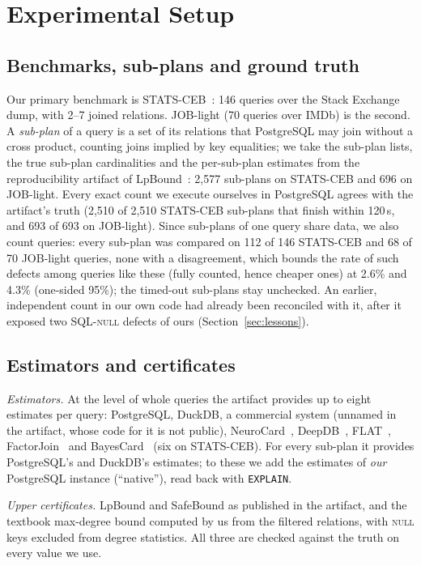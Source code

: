 \documentclass[sigconf, nonacm]{acmart}
\begin{document}
\section{Experimental Setup}
\label{sec:setup}

\subsection{Benchmarks, sub-plans and ground truth}
Our primary benchmark is STATS-CEB~\cite{han2021cardest}: 146 queries over the
Stack Exchange dump, with 2--7 joined relations. JOB-light (70 queries over
IMDb) is the second. A \emph{sub-plan} of a query is a set of its relations that
PostgreSQL may join without a cross product, counting joins implied by key
equalities; we take the sub-plan lists, the true sub-plan cardinalities and the
per-sub-plan estimates from the reproducibility artifact of
LpBound~\cite{zhang2025lpbound}: 2{,}577 sub-plans on STATS-CEB and 696 on
JOB-light. Every exact count we execute ourselves in PostgreSQL agrees with the
artifact's truth (2{,}510 of 2{,}510 STATS-CEB sub-plans that finish within
120\,s, and 693 of 693 on JOB-light). Since sub-plans of one query share data, we
also count queries: every sub-plan was compared on 112 of 146 STATS-CEB and 68
of 70 JOB-light queries, none with a disagreement, which bounds the rate of
such defects among queries like these (fully counted, hence cheaper ones) at 2.6\% and 4.3\%
(one-sided 95\%); the timed-out sub-plans stay unchecked. An earlier, independent count in our own code had already been
reconciled with it, after it exposed two SQL-\textsc{null} defects of ours
(Section~\ref{sec:lessons}).

\subsection{Estimators and certificates}
\emph{Estimators.} At the level of whole queries the artifact provides up to
eight estimates per query: PostgreSQL, DuckDB, a commercial system (unnamed
in the artifact, whose code for it is not public),
NeuroCard~\cite{yang2021neurocard}, DeepDB~\cite{hilprecht2020deepdb},
FLAT~\cite{hertzschuch2021flat}, FactorJoin~\cite{wu2023factorjoin} and
BayesCard~\cite{wu2021bayescard} (six on STATS-CEB). For every sub-plan it
provides PostgreSQL's and DuckDB's estimates; to these we add the estimates of
\emph{our} PostgreSQL instance (``native''), read back with \texttt{EXPLAIN}.

\emph{Upper certificates.} LpBound and SafeBound as published in the artifact,
and the textbook max-degree bound computed by us from the filtered relations,
with \textsc{null} keys excluded from degree statistics. All three are checked
against the truth on every value we use.
\end{document}
